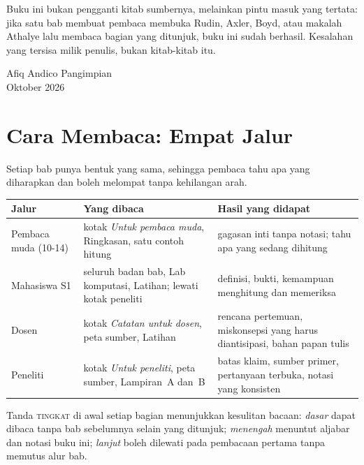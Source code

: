 \documentclass[11pt,a4paper,oneside]{book}
\theoremstyle{definition}
\theoremstyle{plain}
\theoremstyle{remark}
\begin{document}
Buku ini bukan pengganti kitab sumbernya, melainkan pintu masuk yang tertata: jika
satu bab membuat pembaca membuka Rudin, Axler, Boyd, atau makalah Athalye lalu membaca
bagian yang ditunjuk, buku ini sudah berhasil. Kesalahan yang tersisa milik penulis,
bukan kitab-kitab itu.

\enlargethispage{3\baselineskip}
\vspace{0.35cm}
\begin{flushright}
Afiq Andico Pangimpian\\
Oktober 2026
\end{flushright}

\chapter*{Cara Membaca: Empat Jalur}

Setiap bab punya bentuk yang sama, sehingga pembaca tahu apa yang diharapkan dan
boleh melompat tanpa kehilangan arah.

\begin{center}
\small
\begin{tabular}{@{}p{3.1cm}p{4.6cm}p{4.4cm}@{}}
\toprule
\textbf{Jalur} & \textbf{Yang dibaca} & \textbf{Hasil yang didapat} \\
\midrule
Pembaca muda (10-14) & kotak \emph{Untuk pembaca muda}, Ringkasan, satu contoh
  hitung & gagasan inti tanpa notasi; tahu apa yang sedang dihitung \\
Mahasiswa S1 & seluruh badan bab, Lab komputasi, Latihan; lewati kotak peneliti &
  definisi, bukti, kemampuan menghitung dan memeriksa \\
Dosen & kotak \emph{Catatan untuk dosen}, peta sumber, Latihan & rencana
  pertemuan, miskonsepsi yang harus diantisipasi, bahan papan tulis \\
Peneliti & kotak \emph{Untuk peneliti}, peta sumber, Lampiran~A dan~B & batas
  klaim, sumber primer, pertanyaan terbuka, notasi yang konsisten \\
\bottomrule
\end{tabular}
\end{center}

\medskip
Tanda \textsc{tingkat} di awal setiap bagian menunjukkan kesulitan bacaan:
\emph{dasar} dapat dibaca tanpa bab sebelumnya selain yang ditunjuk;
\emph{menengah} menuntut aljabar dan notasi buku ini;
\emph{lanjut} boleh dilewati pada pembacaan pertama tanpa memutus alur bab.
\end{document}
